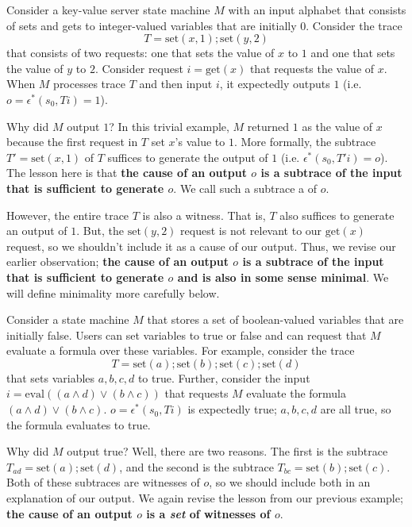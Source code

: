 \begin{example}
  \newcommand{\kvset}{\text{set}}
  \newcommand{\kvget}{\text{get}}
  Consider a key-value server state machine $M$ with an input alphabet that
  consists of sets and gets to integer-valued variables that are initially $0$.
  Consider the trace
  \[
    T = \kvset(x, 1); \kvset(y, 2)
  \]
  that consists of two requests: one that sets the value of $x$ to $1$ and one
  that sets the value of $y$ to $2$. Consider request $i = \kvget(x)$ that
  requests the value of $x$. When $M$ processes trace $T$ and then input $i$,
  it expectedly outputs $1$ (i.e.\ $o = \epsilon^*(s_0, Ti) = 1$).

  Why did $M$ output $1$? In this trivial example, $M$ returned $1$ as the
  value of $x$ because the first request in $T$ set $x$'s value to $1$. More
  formally, the subtrace $T' = \kvset(x, 1)$ of $T$ suffices to generate the
  output of $1$ (i.e.  $\epsilon^*(s_0, T'i) = o$). The lesson here is that
  \textbf{the cause of an output $o$ is a subtrace of the input that is
  sufficient to generate $o$}. We call such a subtrace a  of
  $o$.

  However, the entire trace $T$ is also a witness. That is, $T$ also suffices
  to generate an output of $1$. But, the $\kvset(y, 2)$ request is not relevant
  to our $\kvget(x)$ request, so we shouldn't include it as a cause of our
  output. Thus, we revise our earlier observation; \textbf{the cause of an
  output $o$ is a subtrace of the input that is sufficient to generate $o$ and
  is also in some sense minimal}. We will define minimality more carefully
  below.
\end{example}

\begin{example}
  \newcommand{\Mset}{\text{set}}
  \newcommand{\Meval}{\text{eval}}
  Consider a state machine $M$ that stores a set of boolean-valued variables
  that are initially false. Users can set variables to true or false and can
  request that $M$ evaluate a formula over these variables. For example,
  consider the trace
  \[
    T = \Mset(a); \Mset(b); \Mset(c); \Mset(d)
  \]
  that sets variables $a, b, c, d$ to true. Further, consider the input $i =
  \Meval((a \land d) \lor (b \land c))$ that requests $M$ evaluate the formula
  $(a \land d) \lor (b \land c)$. $o = \epsilon^*(s_0, Ti)$ is expectedly true;
  $a, b, c, d$ are all true, so the formula evaluates to true.

  Why did $M$ output true? Well, there are two reasons. The first is the
  subtrace $T_{ad} = \Mset(a); \Mset(d)$, and the second is the subtrace
  $T_{bc} = \Mset(b); \Mset(c)$. Both of these subtraces are witnesses of $o$,
  so we should include both in an explanation of our output. We again revise
  the lesson from our previous example; \textbf{the cause of an output $o$ is a
  \emph{set} of witnesses of $o$}.
\end{example}

